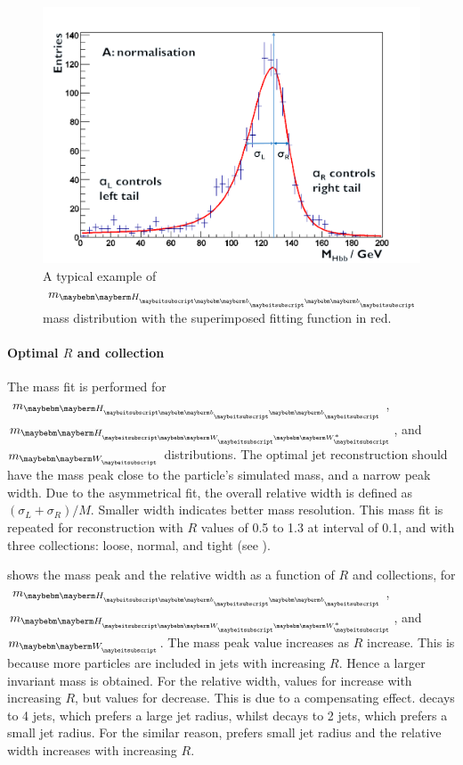 \begin{figure}[!htbp]
\includegraphics[width=\largefigwidth]{doubleHiggs/MCmassFit}
\caption[Example MC mass fit for jet optimisation in double Higgs analysis]%
   {A typical example of  $m_{\Hbb}$  mass distribution with the superimposed fitting function in red.}
   \label{fig:doubleHiggsFitMCMass}
\end{figure}

\paragraph{Optimal $R$ and \PFO collection}

The mass fit is performed for $m_{\Hbb}$, $m_{\HWW}$, and $m_{\PW}$ distributions.  The optimal jet reconstruction should have the mass peak close to the particle's simulated mass, and a narrow peak width. Due to the asymmetrical fit, the overall relative width is defined as $\left(\sigma_L  + \sigma_R\right)/M$. Smaller width indicates better mass resolution. This mass fit is repeated for reconstruction with $R$ values of 0.5 to 1.3 at interval of 0.1, and with three \PFO collections: loose, normal, and tight (see ).

 shows the mass peak and the relative width as a function of $R$ and \PFO collections, for $m_{\Hbb}$, $m_{\HWW}$, and $m_{\PW}$. The mass peak value increases as $R$ increase. This is because more particles are included in jets with increasing $R$. Hence a larger invariant mass is obtained. For the relative width,  values for \Hbb increase with increasing $R$, but values for \HWW decrease. This is due to a compensating  effect. \HWW decays to 4 jets, which prefers a large jet radius, whilst \Hbb decays to 2 jets, which prefers a small jet radius. For the similar reason, \PW prefers small jet radius and the relative width increases with increasing $R$.


